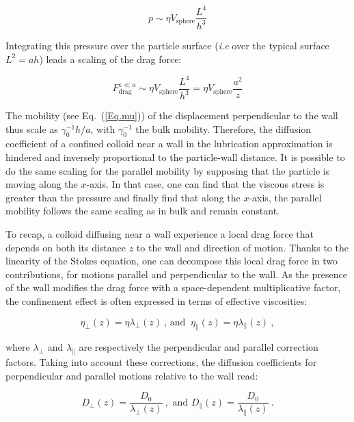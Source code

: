 \begin{equation}
	p \sim \eta V_\mathrm{sphere} \frac{L^4}{h^3}
\end{equation}

Integrating this pressure over the particle surface (\textit{i.e} over the typical surface $L^2 = ah$) leads a scaling of the drag force:

\begin{equation}
	F_\mathrm{drag} ^{z\ll a} \sim \eta V_\mathrm{sphere} \frac{L^4}{h^3} = \eta V_\mathrm{sphere} \frac{a^2}{z}
\end{equation}

The mobility (see Eq.~(\ref{Eq.mu})) of the displacement perpendicular to the wall  thus scale as $\gamma_0^{-1} h/a$, with $\gamma_0^{-1}$ the bulk mobility. Therefore, the diffusion coefficient of a confined colloid near a wall in the lubrication approximation is hindered and inversely proportional to the particle-wall distance. It is possible to do the same scaling for the parallel mobility by supposing that the particle is moving along the $x$-axis. In that case, one can find that the viscous stress is greater than the pressure and finally find that along the $x$-axis, the parallel mobility follows the same scaling as in bulk and remain constant.

To recap, a colloid diffusing near a wall experience a local drag force that depends on both its distance $z$ to the wall and direction of motion. Thanks to the linearity of the Stokes equation, one can decompose this local drag force in two contributions, for motions parallel and perpendicular to the wall. As the presence of the wall modifies the drag force with a space-dependent multiplicative factor, the confinement effect is often expressed in terms of effective viscosities:

\begin{equation}
	\eta _\bot (z) = {\eta}{\lambda _ \bot (z)}  ~ \text{, and } ~\eta _\parallel (z) =  {\eta}{\lambda _ \parallel (z)}~,
\end{equation}

where $\lambda _\bot$ and $\lambda _\parallel$ are respectively the perpendicular and parallel correction factors. Taking into account these corrections, the diffusion coefficients for perpendicular and parallel motions relative to the wall read:

\begin{equation}
	D_\bot (z) =  \frac{D_0}{\lambda _\bot (z)}  ~, \text{ and } D_\parallel (z) = \frac{D_0}{ \lambda_\parallel (z)} ~.
	\label{Eq.hindered}
\end{equation}


